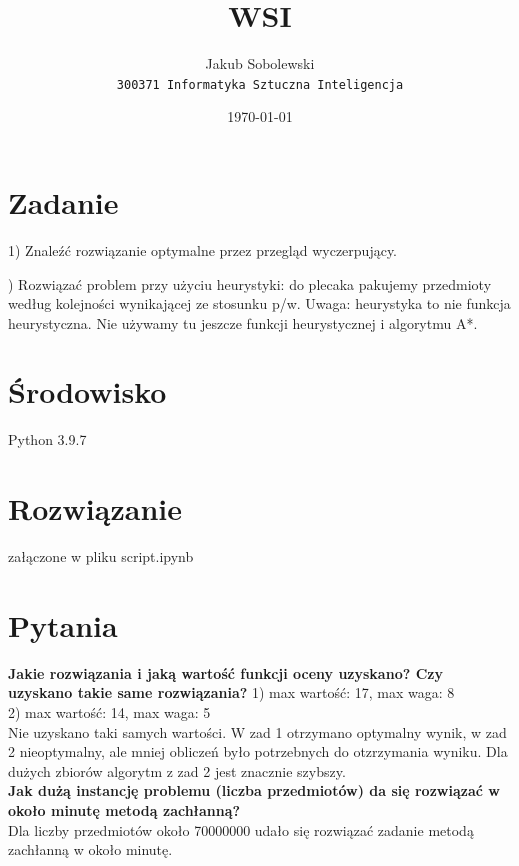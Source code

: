 \documentclass{article}
\title{WSI} %
\author{Jakub Sobolewski\\ \texttt{300371 Informatyka Sztuczna Inteligencja}}
\date{\today}
\begin{document}
\maketitle

\section*{Zadanie} %
1) Znaleźć rozwiązanie optymalne przez przegląd wyczerpujący.

) Rozwiązać problem przy użyciu heurystyki: do plecaka pakujemy przedmioty według kolejności wynikającej ze stosunku p/w. Uwaga: heurystyka to nie funkcja heurystyczna. Nie używamy tu jeszcze funkcji heurystycznej i algorytmu A*.


\section*{Środowisko}
Python 3.9.7

\section*{Rozwiązanie}
załączone w pliku script.ipynb

\section*{Pytania}
\textbf{Jakie rozwiązania i jaką wartość funkcji oceny uzyskano? Czy uzyskano takie same rozwiązania?}
1) max wartość: 17, max waga: 8\\
2) max wartość: 14, max waga: 5\\
Nie uzyskano taki samych wartości. W zad 1 otrzymano optymalny wynik, w zad 2 nieoptymalny, ale mniej obliczeń było potrzebnych do otzrzymania wyniku. Dla dużych zbiorów algorytm z zad 2 jest znacznie szybszy.\\

\noindent \textbf{Jak dużą instancję problemu (liczba przedmiotów) da się rozwiązać w około minutę metodą zachłanną?}\\
Dla liczby przedmiotów około 70000000 udało się rozwiązać zadanie metodą zachłanną w około minutę.\\
\end{document}
